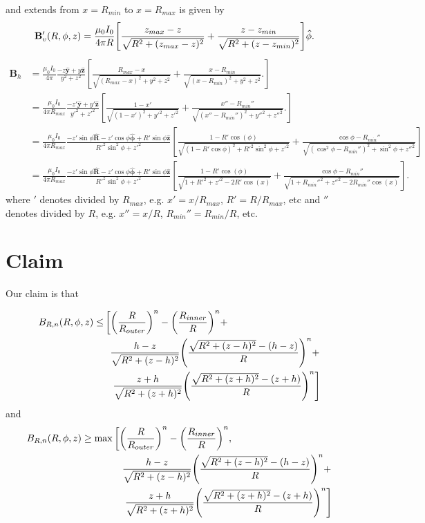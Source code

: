 \documentclass{article}
\let\vec\mathbf
\begin{document}
and extends from $x=R_{min}$ to $x=R_{max}$ is given by
\[
\begin{aligned}
    \vec{B}_{v}'(R, \phi, z) &= \frac{\mu_0 I_0}{4\pi R}\qty[\frac{z_{max}-z}{\sqrt{R^2+(z_{max}-z)^2}} + \frac{z-z_{min}}{\sqrt{R^2+(z-z_{min})^2}}]\vec{\hat{\phi}}.
\end{aligned}\]
\[\begin{aligned}
    \vec{B}_{h} &= \frac{\mu_0 I_0}{4\pi}\frac{-z\vec{\hat{y}} + y\vec{\hat{z}}}{y^2+z^2}\left[\frac{R_{max}-x}{\sqrt{(R_{max}-x)^2+y^2+z^2}}+\frac{x-R_{min}}{\sqrt{(x-R_{min})^2+y^2+z^2}}.\right] \\
    &= \frac{\mu_0 I_0}{4\pi R_{max}}\frac{-z'\vec{\hat{y}} + y'\vec{\hat{z}}}{y'^2+z'^2}\left[\frac{1-x'}{\sqrt{(1-x')^2+y'^2+z'^2}}+\frac{x'' - R_{min}''}{\sqrt{(x''-R_{min}'')^2+y''^2+z''^2}}.\right] \\
    &= \frac{\mu_0 I_0}{4\pi R_{max}}\frac{-z'\sin\phi\vec{\hat{R}} -z'\cos\phi\vec{\hat{\phi}} + R'\sin\phi\vec{\hat{z}}}{R'^2\sin^2\phi+z'^2}\left[\frac{1-R'\cos(\phi)}{\sqrt{(1-R'\cos\phi)^2+R'^2\sin^2\phi+z'^2}}+\frac{\cos\phi-R_{min}''}{\sqrt{(\cos^2\phi-R_{min}'')^2+\sin^2\phi+z''^2}}\right] \\
    &= \frac{\mu_0 I_0}{4\pi R_{max}}\frac{-z'\sin\phi\vec{\hat{R}} -z'\cos\phi\vec{\hat{\phi}} + R'\sin\phi\vec{\hat{z}}}{R'^2\sin^2\phi+z'^2}\left[\frac{1-R'\cos(\phi)}{\sqrt{1+R'^2+z'^2-2R'\cos(x)}}+\frac{\cos\phi-R_{min}''}{\sqrt{1+R_{min}''^2+z''^2-2R_{min}''\cos(x)}}\right].
\end{aligned}\]
where $'$ denotes divided by $R_{max}$, e.g. $x' = x/R_{max}$, $R' = R/R_{max}$, etc and
$''$ denotes divided by $R$, e.g. $x'' = x/R$, $R_{min}'' = R_{min}/R$, etc.

\section{Claim}

Our claim is that 

\[\begin{aligned}
B_{R,n}(R,\phi,z)\le&\left[\qty(\frac{R}{R_{outer}})^n-\qty(\frac{R_{inner}}{R})^n+\right. \\
&\ \ \frac{h-z}{\sqrt{R^2+(z-h)^2}}\qty(\frac{\sqrt{R^2+(z-h)^2}-(h-z)}{R})^n+ \\
&\ \ \left.\frac{z+h}{\sqrt{R^2+(z+h)^2}}\qty(\frac{\sqrt{R^2+(z+h)^2}-(z+h)}{R})^n\right]
\end{aligned}\]
and
\[\begin{aligned}
B_{R,n}(R,\phi,z)\ge\max&\left[\qty(\frac{R}{R_{outer}})^n-\qty(\frac{R_{inner}}{R})^n,\right. \\
&\quad\frac{h-z}{\sqrt{R^2+(z-h)^2}}\qty(\frac{\sqrt{R^2+(z-h)^2}-(h-z)}{R})^n+ \\
&\quad\left.\frac{z+h}{\sqrt{R^2+(z+h)^2}}\qty(\frac{\sqrt{R^2+(z+h)^2}-(z+h)}{R})^n\right]
\end{aligned}\]
\end{document}
